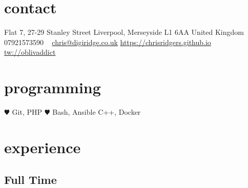 \documentclass[]{friggeri-cv} %
\begin{document}


\begin{aside} %
\section{contact}
Flat 7, 27-29 Stanley Street
Liverpool, Merseyside L1 6AA
United Kingdom
~
07921573590
~
\href{mailto:chris@digiridge.co.uk}{chris@digiridge.co.uk}
\href{https://chrisridgers.github.io}{https://chrisridgers.github.io}
\href{http://twitter.com/oblivaddict}{tw://oblivaddict}
\section{programming}
{\large \color{red} $\varheartsuit$} Git, PHP
{\color{red} $\varheartsuit$} Bash, Ansible
C++, Docker 
\end{aside}


\section{experience}

\subsection{Full Time}
\end{document}
